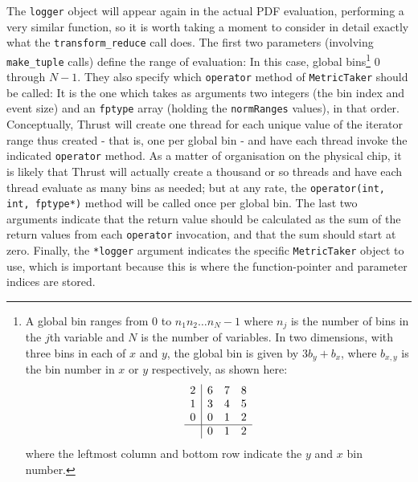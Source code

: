 \documentclass[12pt,pdflatex]{article}
\begin{document}
The \texttt{logger} object will appear again in the actual PDF evaluation,
performing a very similar function, so it is worth taking a moment to 
consider in detail exactly what the \texttt{transform\_reduce} call does. 
The first two parameters (involving \texttt{make\_tuple} calls) define 
the range of evaluation: In this case, global bins\footnote{
A global bin ranges from 0 to $n_1n_2\ldots n_N-1$ where $n_j$ is the number
of bins in the $j$th variable and $N$ is the number of variables. In two dimensions,
with three bins in each of $x$ and $y$, the global bin is given by $3b_y+b_x$,
where $b_{x,y}$ is the bin number in $x$ or $y$ respectively, as shown here:
\begin{displaymath}
\begin{array}{l|ccc}
2 & 6 & 7 & 8 \\
1 & 3 & 4 & 5 \\
0 & 0 & 1 & 2 \\
\hline
  & 0 & 1 & 2 
\end{array} 
\end{displaymath}
where the leftmost column and bottom row indicate the $y$ and $x$ bin number. 
}
 0 through $N-1$. They also specify which \texttt{operator} method of 
\texttt{MetricTaker} should be called: It is the one which takes as arguments
two integers (the bin index and event size) and an \texttt{fptype} array (holding the \texttt{normRanges} values), in 
that order. Conceptually, Thrust will create one thread for each unique value
of the iterator range thus created - that is, one per global bin - and have each
thread invoke the indicated \texttt{operator} method. As a matter of organisation
on the physical chip, it is likely that Thrust will actually create a thousand or
so threads and have each thread evaluate as many bins as needed; but at any rate,
the \verb|operator(int, int, fptype*)| method will be called once per global bin.
The last two arguments indicate that the return value should be calculated as 
the sum of the return values from each \texttt{operator} invocation, and that the sum
should start at zero. Finally, the \verb|*logger| argument indicates the specific
\texttt{MetricTaker} object to use, which is important because this is where the
function-pointer and parameter indices are stored. 
\end{document}
